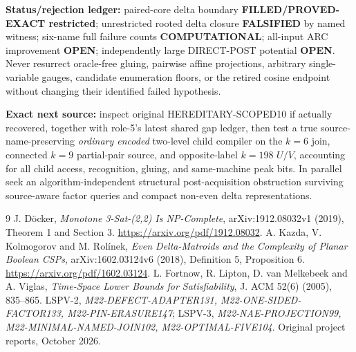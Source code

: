 \documentclass[11pt]{article}
\begin{document}
\textbf{Status/rejection ledger:} paired-core delta boundary \textbf{FILLED/PROVED-EXACT restricted}; unrestricted rooted delta closure \textbf{FALSIFIED} by named witness; six-name full failure counts \textbf{COMPUTATIONAL}; all-input ARC improvement \textbf{OPEN}; independently large DIRECT-POST potential \textbf{OPEN}. Never resurrect oracle-free gluing, pairwise affine projections, arbitrary single-variable gauges, candidate enumeration floors, or the retired cosine endpoint without changing their identified failed hypothesis.

\textbf{Exact next source:} inspect original HEREDITARY-SCOPED10 if actually recovered, together with role-5's latest shared gap ledger, then test a true source-name-preserving \emph{ordinary encoded} two-level child compiler on the $k=6$ join, connected $k=9$ partial-pair source, and opposite-label $k=198$ $U/V$, accounting for all child access, recognition, gluing, and same-machine peak bits. In parallel seek an algorithm-independent structural post-acquisition obstruction surviving source-aware factor queries and compact non-even delta representations.

\begin{thebibliography}{9}
 J. D\"ocker, \emph{Monotone 3-Sat-(2,2) Is NP-Complete}, arXiv:1912.08032v1 (2019), Theorem 1 and Section 3. \url{https://arxiv.org/pdf/1912.08032}.
 A. Kazda, V. Kolmogorov and M. Rol\'inek, \emph{Even Delta-Matroids and the Complexity of Planar Boolean CSPs}, arXiv:1602.03124v6 (2018), Definition 5, Proposition 6. \url{https://arxiv.org/pdf/1602.03124}.
 L. Fortnow, R. Lipton, D. van Melkebeek and A. Viglas, \emph{Time-Space Lower Bounds for Satisfiability}, J. ACM 52(6) (2005), 835--865.
 LSPV-2, \emph{M22-DEFECT-ADAPTER131, M22-ONE-SIDED-FACTOR133, M22-PIN-ERASURE147}; LSPV-3, \emph{M22-NAE-PROJECTION99, M22-MINIMAL-NAMED-JOIN102, M22-OPTIMAL-FIVE104}. Original project reports, October 2026.
\end{thebibliography}
\end{document}
